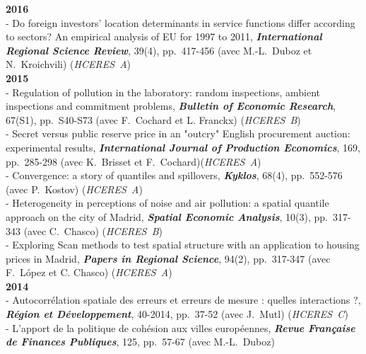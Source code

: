 \documentclass[a4paper,12pt]{article}
\begin{document}
\noindent \textbf{2016}  \smallskip \\ 
 - Do foreign investors' location determinants in service functions differ according to sectors? An empirical analysis of EU for 1997 to 2011, \textit{\textbf{International Regional Science Review}}, 39(4), pp.~417-456 (avec M.-L.~Duboz et N.~Kroichvili) (\textit{HCERES~A}) \\

 \noindent \textbf{2015}  \smallskip \\ 
 - Regulation of pollution in the laboratory: random inspections, ambient inspections and commitment problems, \textit{\textbf{Bulletin of Economic Research}}, 67(S1), pp.~S40-S73 (avec F.~Cochard et L. Franckx) (\textit{HCERES~B}) \\
- Secret versus public reserve price in an "outcry" English procurement auction: experimental results, \textit{\textbf{International Journal of Production Economics}}, 169, pp.~285-298 (avec K.~Brisset et F.~Cochard)(\textit{HCERES~A}) \\
- Convergence: a story of quantiles and spillovers, \textit{\textbf{Kyklos}}, 68(4), pp.~552-576 (avec P.~Kostov) (\textit{HCERES~A}) \\
- Heterogeneity in perceptions of noise and air pollution: a spatial quantile approach on the city of Madrid, \textit{\textbf{Spatial Economic Analysis}}, 10(3), pp.~317-343 (avec C.~Chasco) (\textit{HCERES~B}) \\
- Exploring Scan methods to test spatial structure with an application to housing prices in Madrid, \textit{\textbf{Papers in Regional Science}}, 94(2), pp.~317-347 (avec F.~López et C. Chasco) (\textit{HCERES~A}) \\

\noindent \textbf{2014}  \smallskip \\ 
- Autocorrélation spatiale des erreurs et erreurs de mesure : quelles interactions ?, \textit{\textbf{Région et Développement}}, 40-2014, pp.~37-52 (avec J.~Mutl) (\textit{HCERES~C}) \\
- L'apport de la politique de cohésion aux villes européennes, \textit{\textbf{Revue Fran\c caise de Finances Publiques}}, 125, pp.~57-67 (avec M.-L.~Duboz) \\
\end{document}

